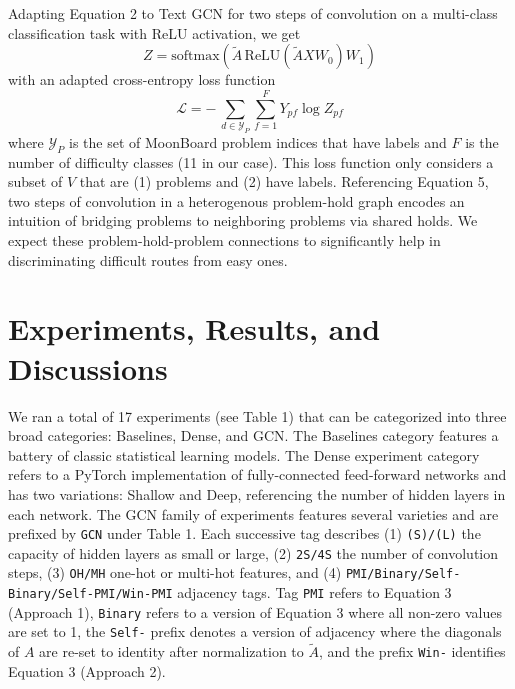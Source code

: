 \documentclass{article}
\begin{document}
Adapting Equation 2 to Text GCN for two steps of convolution on a multi-class classification task with ReLU activation, we get
\begin{equation}
Z = \text{softmax}(\widetilde{A}\,\text{ReLU}(\widetilde{A}XW_{0})W_{1})
\end{equation}
with an adapted cross-entropy loss function
\begin{equation}
\mathcal{L} = -\,\sum_{d\in\mathcal{Y}_P} \sum_{f=1}^{F} Y_{pf}\log Z_{pf}
\end{equation}
where $\mathcal{Y}_P$ is the set of MoonBoard problem indices that have labels and $F$ is the number of difficulty classes (11 in our case). This loss function only considers a subset of $V$ that are (1) problems and (2) have labels. Referencing Equation 5, two steps of convolution in a heterogenous problem-hold graph encodes an intuition of bridging problems to neighboring problems via shared holds. We expect these problem-hold-problem connections to significantly help in discriminating difficult routes from easy ones. 

\section{Experiments, Results, and Discussions}
We ran a total of 17 experiments (see Table 1) that can be categorized into three broad categories: Baselines, Dense, and GCN. The Baselines category features a battery of classic statistical learning models. The Dense experiment category refers to a PyTorch implementation of fully-connected feed-forward networks and has two variations: Shallow and Deep, referencing the number of hidden layers in each network. The GCN family of experiments features several varieties and are prefixed by \texttt{GCN} under Table 1. Each successive tag describes (1) \texttt{(S)/(L)} the capacity of hidden layers as small or large, (2) \texttt{2S/4S} the number of convolution steps, (3) \texttt{OH/MH} one-hot or multi-hot features, and (4) \texttt{PMI/Binary/Self-Binary/Self-PMI/Win-PMI} adjacency tags. Tag \texttt{PMI} refers to Equation 3 (Approach 1), \texttt{Binary} refers to a version of Equation 3 where all non-zero values are set to 1, the \texttt{Self-} prefix denotes a version of adjacency where the diagonals of $A$ are re-set to identity after normalization to $\widetilde{A}$, and the prefix \texttt{Win-} identifies Equation 3 (Approach 2). 
\end{document}
